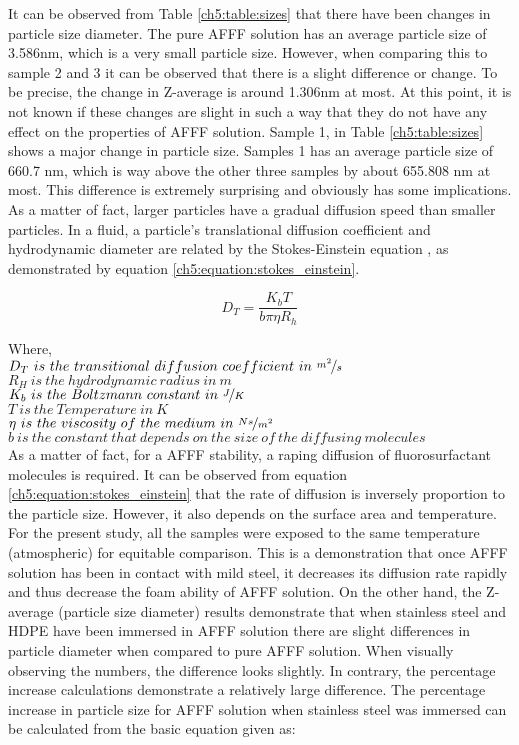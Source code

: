 It can be observed from Table \ref{ch5:table:sizes} that there have been changes in particle size diameter. The pure AFFF solution has an average particle size of 3.586nm, which is a very small particle size. However, when comparing this to sample 2 and 3 it can be observed that there is a slight difference or change. To be precise, the change in Z-average is around 1.306nm at most. At this point, it is not known if these changes are slight in such a way that they do not have any effect on the properties of AFFF solution. Sample 1, in Table \ref{ch5:table:sizes} shows a major change in particle size. Samples 1 has an average particle size of 660.7 nm, which is way above the other three samples by about 655.808 nm at most. This difference is extremely surprising and obviously has some implications. As a matter of fact, larger particles have a gradual diffusion speed than smaller particles. In a fluid, a particle's translational diffusion coefficient and hydrodynamic diameter are related by the Stokes-Einstein equation \cite{lin1991handbook}, as demonstrated by equation \ref{ch5:equation:stokes_einstein}.

\begin{equation}
    D_T=\frac{K_bT}{b\pi \eta R_h}
    \label{ch5:equation:stokes_einstein}
\end{equation}

\noindent Where, \\
$D_T\ is\ the\ transitional\ diffusion\ coefficient\ in\ \nicefrac{m^2}{s}$ \\
$R_H\ is\ the\ hydrodynamic\ radius\ in\ m$ \\
$K_b\ is\ the\ Boltzmann\ constant\ in\ \nicefrac{J}{K}$ \\
$T\ is\ the\ Temperature\ in\ K$ \\
$\eta\ is\ the\ viscosity\ of\ the\ medium\ in\ \nicefrac{Ns}{m^2}$ \\
$b\ is\ the\ constant\ that\ depends\ on\ the\ size\ of\ the\ diffusing\ molecules$ \\

As a matter of fact, for a AFFF stability, a raping diffusion of fluorosurfactant molecules is required. It can be observed from equation \ref{ch5:equation:stokes_einstein} that the rate of diffusion is inversely proportion to the particle size. However, it also depends on the surface area and temperature. For the present study, all the samples were exposed to the same temperature (atmospheric) for equitable comparison. This is a demonstration that once AFFF solution has been in contact with mild steel, it decreases its diffusion rate rapidly and thus decrease the foam ability of AFFF solution.  On the other hand, the Z-average (particle size diameter) results demonstrate that when stainless steel and HDPE have been immersed in AFFF solution there are slight differences in particle diameter when compared to pure AFFF solution. When visually observing the numbers, the difference looks slightly. In contrary, the percentage increase calculations demonstrate a relatively large difference. The percentage increase in particle size for AFFF solution when stainless steel was immersed can be calculated from the basic equation given as: 

